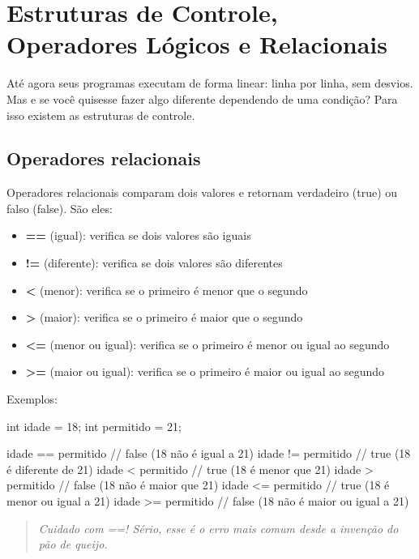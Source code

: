 
\chapter{Estruturas de Controle, Operadores Lógicos e Relacionais}

Até agora seus programas executam de forma linear: linha por linha, sem desvios. Mas e se você quisesse fazer algo diferente dependendo de uma condição?  Para isso existem as estruturas de controle.

\section{Operadores relacionais}

Operadores relacionais comparam dois valores e retornam verdadeiro (true) ou falso (false). São eles:

\begin{itemize}
  \item \textbf{==} (igual): verifica se dois valores são iguais
  \item \textbf{!=} (diferente): verifica se dois valores são diferentes
  \item \textbf{<} (menor): verifica se o primeiro é menor que o segundo
  \item \textbf{>} (maior): verifica se o primeiro é maior que o segundo
  \item \textbf{<=} (menor ou igual): verifica se o primeiro é menor ou igual ao segundo
  \item \textbf{>=} (maior ou igual): verifica se o primeiro é maior ou igual ao segundo
\end{itemize}

Exemplos:

\begin{ccode}
  int idade = 18;
  int permitido = 21;

  idade == permitido      // false (18 não é igual a 21)
  idade != permitido      // true (18 é diferente de 21)
  idade < permitido       // true (18 é menor que 21)
  idade > permitido       // false (18 não é maior que 21)
  idade <= permitido      // true (18 é menor ou igual a 21)
  idade >= permitido      // false (18 não é maior ou igual a 21)
\end{ccode}

\begin{quote}
\textit{Cuidado com ==! Sério, esse é o erro mais comum desde a invenção do pão de queijo.}
\end{quote}

